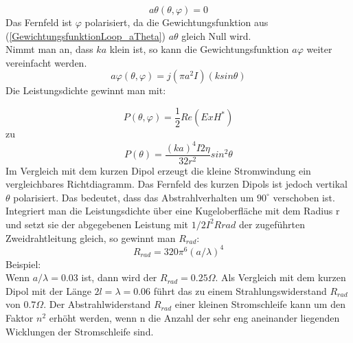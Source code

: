 \begin{equation}\label{GewichtungsfunktionLoop_aTheta}
a\theta(\theta, \varphi) =0
\end{equation}
Das Fernfeld   ist  $\varphi$ polarisiert, da die Gewichtungsfunktion aus  (\ref{GewichtungsfunktionLoop_aTheta})  $a\theta$ gleich Null wird.\\
Nimmt man  an, dass $ka$ klein ist, so kann  die Gewichtungsfunktion $a\varphi$ weiter vereinfacht werden.
\begin{equation}
a\varphi(\theta,\varphi)=j(\pi a^{2}I)(k sin \theta)
\end{equation}
 Die Leistungsdichte gewinnt man mit: 

\begin{equation}
P(\theta,\varphi)=\frac{1}{2}Re(E x H^*)
\end{equation}
zu
\begin{equation}
P(\theta)=\frac{(ka)^{4}I{2}\eta}{32r^{2}}sin^{2}\theta
\end{equation}
Im Vergleich mit dem kurzen Dipol erzeugt die kleine Stromwindung ein vergleichbares Richtdiagramm. Das Fernfeld des kurzen Dipols ist jedoch vertikal $\theta$ polarisiert. Das bedeutet, dass das Abstrahlverhalten um $90^\circ$ verschoben ist. Integriert man die Leistungsdichte über eine Kugeloberfläche mit dem Radius r  und setzt sie der abgegebenen Leistung mit $1/2 I^{2}Rrad $ der zugeführten Zweidrahtleitung gleich, so gewinnt man $R_{rad}$:
\begin{equation}
R_{rad} = 320\pi^{6} (a/\lambda)^{4}\label{eq:RradLoop}
\end{equation}
Beispiel:\\
Wenn $a/\lambda = 0.03$ ist, dann wird der $R_{rad} = 0.25\Omega$. Als Vergleich mit dem kurzen Dipol mit der Länge $2l=\lambda= 0.06$ führt das zu einem Strahlungswiderstand $R_{rad}$ von $0.7\Omega$.  Der Abstrahlwiderstand $R_{rad}$ einer kleinen Stromschleife kann um den Faktor $n^{2}$ erhöht werden, wenn n die Anzahl der sehr eng aneinander liegenden Wicklungen der Stromschleife sind. 



